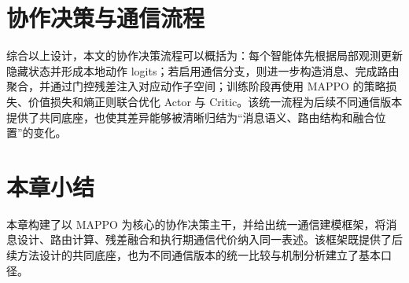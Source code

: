 \section{协作决策与通信流程}

综合以上设计，本文的协作决策流程可以概括为：每个智能体先根据局部观测更新隐藏状态并形成本地动作 logits；若启用通信分支，则进一步构造消息、完成路由聚合，并通过门控残差注入对应动作子空间；训练阶段再使用 MAPPO 的策略损失、价值损失和熵正则联合优化 Actor 与 Critic。该统一流程为后续不同通信版本提供了共同底座，也使其差异能够被清晰归结为“消息语义、路由结构和融合位置”的变化。

\section{本章小结}

本章构建了以 MAPPO 为核心的协作决策主干，并给出统一通信建模框架，将消息设计、路由计算、残差融合和执行期通信代价纳入同一表述。该框架既提供了后续方法设计的共同底座，也为不同通信版本的统一比较与机制分析建立了基本口径。
